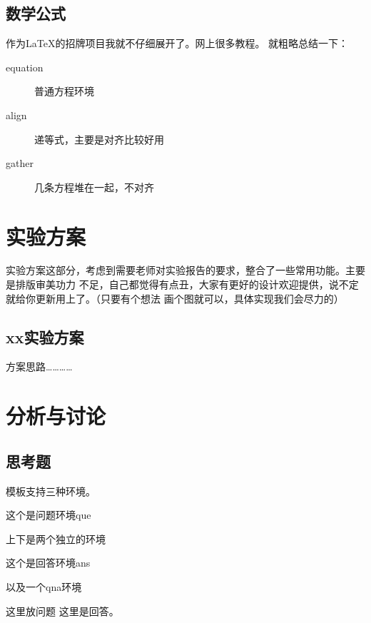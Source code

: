 \documentclass{spaexp}
\begin{document}
    \subsection{数学公式}
        作为\LaTeX 的招牌项目我就不仔细展开了。网上很多教程。
        就粗略总结一下：
        \begin{description}
            \item[equation] 普通方程环境
            \item[align] 递等式，主要是对齐比较好用
            \item[gather] 几条方程堆在一起，不对齐
        \end{description}
    
\section{实验方案}
    实验方案这部分，考虑到需要老师对实验报告的要求，整合了一些常用功能。主要是排版审美功力
    不足，自己都觉得有点丑，大家有更好的设计欢迎提供，说不定就给你更新用上了。（只要有个想法
    画个图就可以，具体实现我们会尽力的）

    \subsection{xx实验方案}
        方案思路…………

        \recordhead
        \begin{step}
            \movehead
        \end{step}

\section{分析与讨论}
    \subsection{思考题}
        模板支持三种环境。
        \begin{que}
            这个是问题环境que
        \end{que}
        \vspace{1cm}
        上下是两个独立的环境
        \vspace{1cm}
        \begin{ans}
            这个是回答环境ans
        \end{ans}

        以及一个qna环境
        \begin{qna}{这里放问题}
            这里是回答。
        \end{qna}
\end{document}
